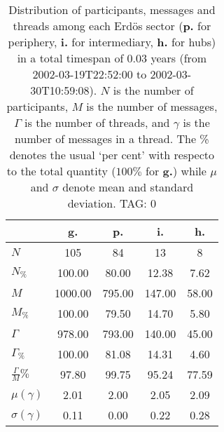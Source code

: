 \begin{table}[h!]
\begin{center}
\begin{tabular}{| l || c | c | c | c |}\hline
 & {\bf g.} & {\bf p.} & {\bf i.} & {\bf h.} \\\hline\hline
$N$ & 105  & 84  & 13  & 8 \\
$N_{\%}$ & 100.00  & 80.00  & 12.38  & 7.62 \\\hline
$M$ & 1000.00  & 795.00  & 147.00  & 58.00 \\
$M_{\%}$ & 100.00  & 79.50  & 14.70  & 5.80 \\\hline
$\Gamma$ & 978.00  & 793.00  & 140.00  & 45.00 \\
$\Gamma_{\%}$ & 100.00  & 81.08  & 14.31  & 4.60 \\\hline
$\frac{\Gamma}{M}\%$ & 97.80  & 99.75  & 95.24  & 77.59 \\
$\mu(\gamma)$ & 2.01  & 2.00  & 2.05  & 2.09 \\
$\sigma(\gamma)$ & 0.11  & 0.00  & 0.22  & 0.28 \\\hline
\end{tabular}
\caption{Distribution of participants, messages and threads among each Erd\"os sector ({\bf p.} for periphery, {\bf i.} for intermediary, 
    {\bf h.} for hubs) in a total timespan of 0.03 years (from 2002-03-19T22:52:00 to 2002-03-30T10:59:08). $N$ is the number of participants, $M$ is the number of messages, $\Gamma$ is the number of threads, and $\gamma$ is the number of messages in a thread.
    The \% denotes the usual `per cent' with respecto to the total quantity ($100\%$ for {\bf g.})
    while $\mu$ and $\sigma$ denote mean and standard deviation. TAG: 0}
\end{center}
\end{table}